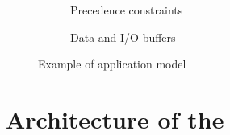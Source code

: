 \documentclass[main.tex]{subfiles}
\begin{document}
\begin{example}
    \begin{figure}
        \centering
        \begin{subfigure}[b]{0.49\linewidth}
            \centering
            
            \caption{Precedence constraints}
            \label{fig_all_appModelPrecs}
        \end{subfigure}
        \begin{subfigure}[b]{0.49\linewidth}
            \centering
            
            \caption{Data and I/O buffers}
            \label{fig_all_appModelDataflow}
        \end{subfigure}
        \caption{Example of application model}
        \label{fig_stateOfTheArt_2_appModelExample}
    \end{figure}
\end{example}






















\section{Architecture of the \mppalong}
\label{sec_systemModel_archiMppa}

\end{document}
